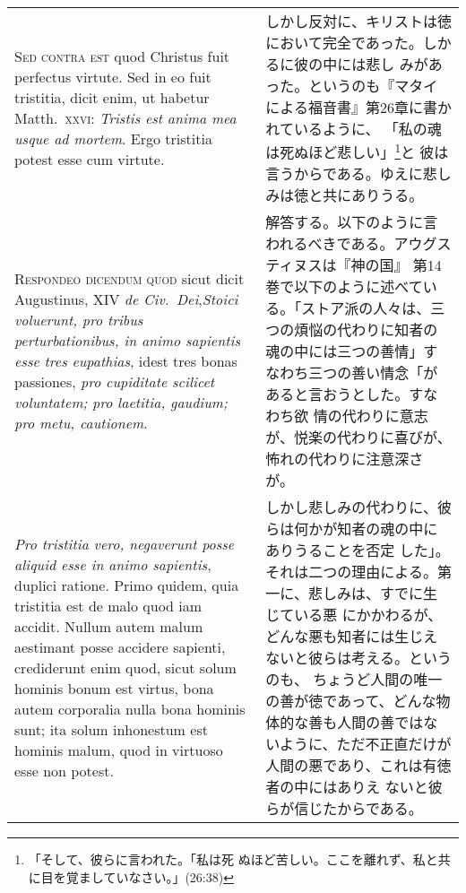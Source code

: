 \documentclass[10pt]{jsarticle}
\begin{document}
\begin{longtable}{p{21em}p{21em}}
{\scshape Sed contra est} quod Christus fuit perfectus virtute. Sed in
eo fuit tristitia, dicit enim, ut habetur Matth.~{\scshape xxvi}:
{\itshape Tristis est anima mea usque ad mortem}. Ergo tristitia
potest esse cum virtute.


&

しかし反対に、キリストは徳において完全であった。しかるに彼の中には悲し
みがあった。というのも『マタイによる福音書』第26章に書かれているように、
「私の魂は死ぬほど悲しい」\footnote{「そして、彼らに言われた。「私は死
ぬほど苦しい。ここを離れず、私と共に目を覚ましていなさい。」(26:38)}と
彼は言うからである。ゆえに悲しみは徳と共にありうる。
 
\\



 {\scshape Respondeo dicendum quod} sicut dicit Augustinus, XIV
 {\itshape de Civ.~Dei},{\itshape  Stoici voluerunt, pro tribus
 perturbationibus, in animo sapientis esse tres eupathias}, idest tres
 bonas passiones, {\itshape pro cupiditate scilicet voluntatem; pro laetitia,
 gaudium; pro metu, cautionem}.

&

 解答する。以下のように言われるべきである。アウグスティヌスは『神の国』
 第14巻で以下のように述べている。「ストア派の人々は、三つの煩悩の代わりに知者の
 魂の中には三つの善情」すなわち三つの善い情念「があると言おうとした。すなわち欲
 情の代わりに意志が、悦楽の代わりに喜びが、怖れの代わりに注意深さが。

\\

 {\itshape Pro tristitia vero, negaverunt posse aliquid esse in animo sapientis},
 duplici ratione. Primo quidem, quia tristitia est de malo quod iam
 accidit. Nullum autem malum aestimant posse accidere sapienti,
 crediderunt enim quod, sicut solum hominis bonum est virtus, bona
 autem corporalia nulla bona hominis sunt; ita solum inhonestum est
 hominis malum, quod in virtuoso esse non potest.

 &

 しかし悲しみの代わりに、彼らは何かが知者の魂の中にありうることを否定
 した」。それは二つの理由による。第一に、悲しみは、すでに生じている悪
 にかかわるが、どんな悪も知者には生じえないと彼らは考える。というのも、
 ちょうど人間の唯一の善が徳であって、どんな物体的な善も人間の善ではな
 いように、ただ不正直だけが人間の悪であり、これは有徳者の中にはありえ
 ないと彼らが信じたからである。

\\



\end{longtable}
\end{document}
